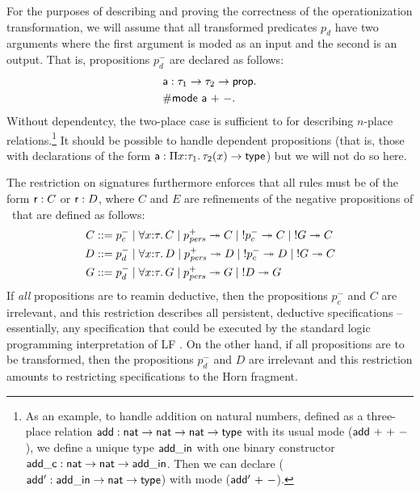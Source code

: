 For the purposes of describing and proving the correctness of the
operationization transformation, we will assume that all transformed
predicates $p_d$ have two arguments where the first argument is moded
as an input and the second is an output. That is, propositions $p_d^-$
are declared as follows:
\begin{align*}
& {\sf a} : \tau_1 \rightarrow \tau_2 \rightarrow {\sf prop}.\\
& {\sf \#mode~a~{+}~{-}}.
\end{align*}
Without dependentcy, the two-place case is sufficient to for
describing $n$-place relations.\footnote{As an example, to handle
  addition on natural numbers, defined as a three-place relation ${\sf
    add} : {\sf nat} \rightarrow {\sf nat} \rightarrow {\sf nat}
  \rightarrow {\sf type}$ with its usual mode (${\sf
    add}~{+}~{+}~{-}$), we define a unique type ${\sf add\_in}$ with
  one binary constructor ${\sf add\_c} : {\sf nat} \rightarrow {\sf
    nat} \rightarrow {\sf add\_in}$. Then we can declare (${\sf add'}
  : {\sf add\_in} \rightarrow {\sf nat} \rightarrow {\sf type}$) with
  mode (${\sf add'}~{+}~{-}$).}  It should be possible to handle
dependent propositions (that is, those with declarations of the form
${\sf a} : \Pi x{:}\tau_1.\,\tau_2(x) \rightarrow {\sf type}$) but we
will not do so here.

The restriction on signatures furthermore enforces that all rules must
be of the form ${\sf r} : C$ or ${\sf r} : D$, where $C$ and $E$ are
refinements of the negative propositions of \sls~that are defined as
follows:
\begin{align*}
C & ::= p^-_{c} 
    \mid \forall x{:}\tau.\, C
    \mid p^+_{\it pers} \twoheadrightarrow C
    \mid {!}p^-_c \twoheadrightarrow C
    \mid {!}G \twoheadrightarrow C \\
D & ::= p^-_{d}
    \mid \forall x{:}\tau.\, D
    \mid p^+_{\it pers} \twoheadrightarrow D
    \mid {!}p^-_c \twoheadrightarrow D
    \mid {!}G \twoheadrightarrow C \\
G & ::= p^-_d 
    \mid \forall x{:}\tau.\, G
    \mid p^+_{\it pers} \twoheadrightarrow G
    \mid {!}D \twoheadrightarrow G
\end{align*}
If {\it all} propositions are to reamin deductive, then the
propositions $p^-_c$ and $C$ are irrelevant, and this restriction
describes all persistent, deductive specifications -- essentially, any
specification that could be executed by the standard logic programming
interpretation of LF \cite{pfenning98elf}. On the other hand, if all
propositions are to be transformed, then the propositions $p^-_d$ and
$D$ are irrelevant and this restriction amounts to restricting
specifications to the Horn fragment.

